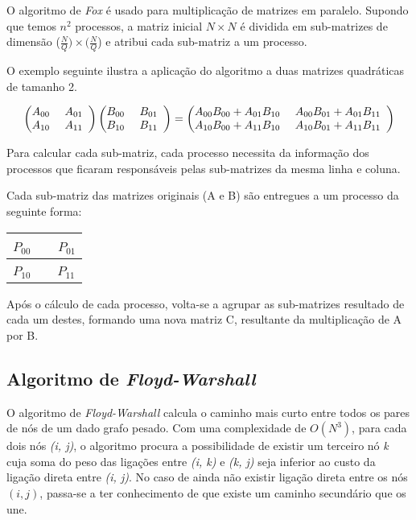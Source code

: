 \documentclass{llncs}
\begin{document}
O algoritmo de \textit{Fox} é usado para multiplicação de matrizes em paralelo. Supondo que temos $n^2$ processos, a matriz inicial $N\times N$ é dividida em sub-matrizes de dimensão ($\frac{N}{Q})\times(\frac{N}{Q}$) e atribui cada sub-matriz a um processo.

O exemplo seguinte ilustra a aplicação do algoritmo a duas matrizes quadráticas de tamanho 2.

\begin{equation}
  \left(\begin{array}{@{}*{16}{c}@{}}
    A_{00}\, & \,A_{01} \\
    A_{10}\, & \,A_{11}
  \end{array}\right)
  \left(\begin{array}{@{}*{16}{c}@{}}
    B_{00}\, & \,B_{01} \\
    B_{10}\, & \,B_{11}
  \end{array}\right) =
  \left(\begin{array}{@{}*{16}{c}@{}}
    A_{00}B_{00} + A_{01}B_{10}\, & \,A_{00}B_{01} + A_{01}B_{11} \\
    A_{10}B_{00} + A_{11}B_{10}\, & \,A_{10}B_{01} + A_{11}B_{11}
  \end{array}\right)
\end{equation}

Para calcular cada sub-matriz, cada processo necessita da informação dos processos que ficaram responsáveis pelas sub-matrizes da mesma linha e coluna.

Cada sub-matriz das matrizes originais (A e B) são entregues a um processo da seguinte forma:

\begin{table}[]
\centering
\renewcommand{\arraystretch}{2}
\begin{tabular}{l|l}
$P_{00}$ \, & \, $P_{01}$ \\ [1.4mm]
\hline
$P_{10}$ \, & \, $P_{11}$
\end{tabular}
\end{table}

Após o cálculo de cada processo, volta-se a agrupar as sub-matrizes resultado de cada um destes, formando uma nova matriz C, resultante da multiplicação de A por B.

\subsection{Algoritmo de \textit{Floyd-Warshall}}

O algoritmo de \textit{Floyd-Warshall} calcula o caminho mais curto entre todos os pares de nós de um dado grafo pesado. Com uma complexidade de $O(N^3)$, para cada dois nós \textit{(i, j)}, o algoritmo procura a possibilidade de existir um terceiro nó \textit{k} cuja soma do peso das ligações entre \textit{(i, k)} e \textit{(k, j)} seja inferior ao custo da ligação direta entre \textit{(i, j)}. No caso de ainda não existir ligação direta entre os nós $(i, j)$, passa-se a ter conhecimento de que existe um caminho secundário que os une.
\end{document}
